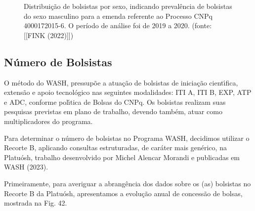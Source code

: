 \documentclass[
12pt,		%
openright,	%
twoside,  %
a4paper,			%
chapter=TITLE,		%
english,			%
french,				%
spanish,			%
brazil				%
]{USPSC-classe/USPSC}
\begin{document}
\begin{figure}[max size={\textwidth}{\textheight}]
\begin{minipage}[b]{0.4\linewidth}
                \caption{Distribui\c{c}\~ao de bolsistas por sexo, indicando preval\^encia de bolsistas do sexo masculino para a emenda referente ao Processo CNPq 4000172015-6. O per\'{i}odo de an\'alise foi de 2019 a 2020. (fonte: [[FINK (2022)]])}
                \label{1164a3115bd14e3f25b6b141840652ffbd0d2374}
\end{minipage}
\hspace{0.5cm}
\end{figure}



\subsection[N\'umero de Bolsistas]{N\'umero de Bolsistas}\label{N\'umero de Bolsistas}
O m\'etodo do WASH, pressup\~oe a atua\c{c}\~ao de bolsistas de inicia\c{c}\~ao cient\'{\i}fica, extens\~ao e apoio tecnol\'ogico nas seguintes modalidades: ITI A, ITI B, EXP, ATP e ADC, conforme pol\'{\i}tica de Bolsas do CNPq. Os bolsistas realizam suas pesquisas previstas em plano de trabalho, devendo tamb\'em, atuar como multiplicadores do programa.








Para determinar o n\'umero de bolsistas no Programa WASH, decidimos utilizar o Recorte B, aplicando consultas estruturadas, de car\'ater mais gen\'erico, na Platu\'osh, trabalho desenvolvido por Michel Alencar Morandi e publicadas em  WASH (2023).








Primeiramente, para averiguar a abrang\^encia dos dados sobre os (as) bolsistas  no Recorte B da Platu\'osh, apresentamos a evolu\c{c}\~ao anual de concess\~ao de bolsas, mostrada na Fig. 42.
\end{document}

